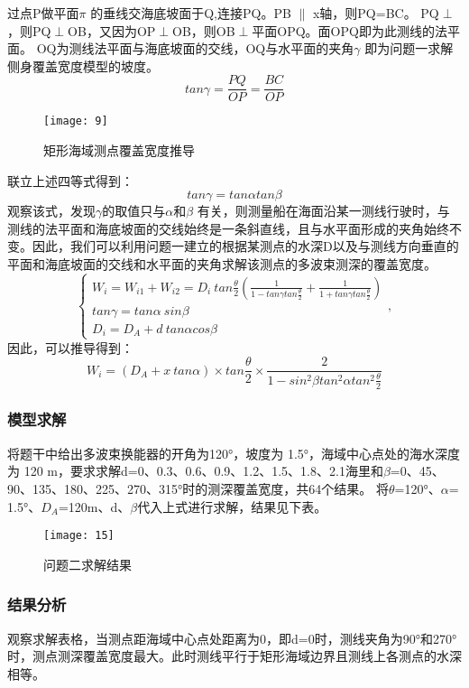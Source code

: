 \documentclass[withoutpreface,bwprint]{cumcmthesis} %
\begin{document}
过点P做平面$\pi$ 的垂线交海底坡面于Q,连接PQ。PB $\parallel$ x轴，则PQ=BC。
PQ$\perp$，则PQ$\perp$OB，又因为OP$\perp$OB，则OB$\perp$平面OPQ。面OPQ即为此测线的法平面。
OQ为测线法平面与海底坡面的交线，OQ与水平面的夹角$\gamma$ 即为问题一求解侧身覆盖宽度模型的坡度。
\begin{equation}
tan\gamma=\frac{PQ}{OP}=\frac{BC}{OP}
\end{equation}
\begin{figure}[H]
    \centering
    \texttt{[image: 9]}
    \caption{矩形海域测点覆盖宽度推导}
    \label{fig:four}
\end{figure}
联立上述四等式得到：
\begin{equation}
tan\gamma=tan\alpha tan\beta
\end{equation}
观察该式，发现$\gamma$的取值只与$\alpha $和$\beta$ 有关，则测量船在海面沿某一测线行驶时，与测线的法平面和海底坡面的交线始终是一条斜直线，且与水平面形成的夹角始终不变。因此，我们可以利用问题一建立的根据某测点的水深D以及与测线方向垂直的平面和海底坡面的交线和水平面的夹角求解该测点的多波束测深的覆盖宽度。
\begin{equation}
\left\{
\begin{aligned}
W_i=W_{i1}+W_{i2}=D_i\ tan\frac{\theta}{2}(\frac{1}{1-tan\gamma tan\frac{\theta}{2}}+\frac{1}{1+tan\gamma tan\frac{\theta}{2}})\\
tan\gamma=tan\alpha\ sin\beta\\
D_i=D_A+d\ tan\alpha cos\beta
\end{aligned}
\right.
,
\end{equation}
因此，可以推导得到：
\begin{equation}
W_i=(D_A+x\ tan\alpha)\times tan{\frac{\theta}{2}}\times \frac{2}{1-sin^2{\beta}tan^2{\alpha}tan^2{\frac{\theta}{2}}}
\end{equation}
\subsubsection{模型求解}
将题干中给出多波束换能器的开角为120°，坡度为 1.5°，海域中心点处的海水深度为 120 m，要求求解d=0、0.3、0.6、0.9、1.2、1.5、1.8、2.1海里和$\beta$=0、45、90、135、180、225、270、315°时的测深覆盖宽度，共64个结果。
将$\theta$=120°、$\alpha$= 1.5°、$D_A$=120m、d、$\beta$代入上式进行求解，结果见下表。
\begin{figure}[H]
    \centering
    \texttt{[image: 15]}
    \caption{问题二求解结果}
    \label{fig:four}
\end{figure}
\subsubsection{结果分析}
观察求解表格，当测点距海域中心点处距离为0，即d=0时，测线夹角为90°和270°时，测点测深覆盖宽度最大。此时测线平行于矩形海域边界且测线上各测点的水深相等。
\end{document}
